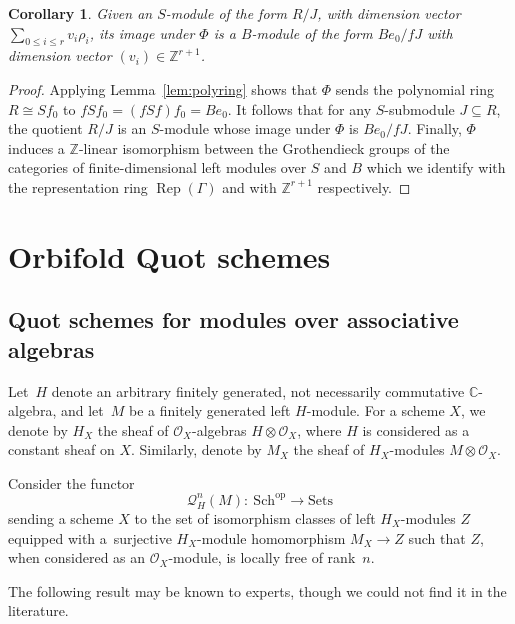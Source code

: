 \documentclass[pdftex]{sigma}%
\newtheorem{Corollary}[Theorem]{Corollary}
\newcommand{\SC}{\mathbb{C}} %
\newcommand{\Rep}{\operatorname{Rep}}
\numberwithin{equation}{section}
\begin{document}
\begin{Corollary}\label{cor_fd}
Given an $S$-module of the form $R/J$, with dimension vector $\sum_{0\leq i\leq r} v_i \rho_i$, its image under $\Phi$ is a $B$-module of the form $B e_0/fJ$ with dimension vector $(v_i)\in\mathbb{Z}^{r+1}$.
\end{Corollary}
\begin{proof}
Applying Lemma~\ref{lem:polyring} shows that $\Phi$ sends the polynomial ring $R\cong Sf_0$ to $fSf_0 =(fSf)f_0 = Be_0$. It follows that for any
$S$-submodule
$J\subseteq R$, the quotient $R/J$ is an $S$-module whose image under $\Phi$ is $Be_0/fJ$. Finally, $\Phi$ induces a $\mathbb{Z}$-linear isomorphism between the Grothendieck groups of the categories of finite-dimensional left modules over $S$ and $B$ which we identify with the representation ring $\Rep(\Gamma)$ and with $\mathbb{Z}^{r+1}$ respectively.
\end{proof}

\section{Orbifold Quot schemes}\label{sec:quot}

\subsection{Quot schemes for modules over associative algebras}\label{sect:generalquot}

Let~$H$ denote an arbitrary finitely generated,
not necessarily commutative $\SC$-algebra, and let~$M$ be a finitely
generated left $H$-module.
For a scheme $X$, we denote by $H_{X}$ the sheaf of $\mathcal{O}_X$-algebras
$H \otimes \mathcal{O}_X$, where $H$ is considered as a constant sheaf on $X$. Similarly, denote by $M_{X}$ the sheaf of $H_{X}$-modules
$M \otimes \mathcal{O}_X$.

Consider the functor
\[
\mathcal{Q}^{n}_H(M)\colon \ \mathrm{Sch}^{\mathrm{op}} \to \mathrm{Sets} \]
sending a scheme $X$ to the set of isomorphism classes of left $H_{X}$-modules $Z$ equipped with a~surjective $H_{X}$-module homomorphism
$M_{X} \to Z$ such that $Z$,
when considered as an $\mathcal{O}_{X}$-module, is locally free of rank~$n$.

The following result may be known to experts, though we could not find it in the literature.
\end{document}
